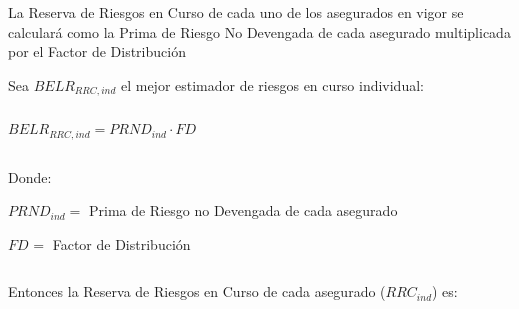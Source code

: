 \documentclass[11pt,twoside,openright,spanish]{report}
\numberwithin{equation}{chapter}
\numberwithin{figure}{chapter}
\numberwithin{table}{chapter}
\begin{document}
	\doublespacing
	
	La Reserva de Riesgos en Curso de cada uno de los asegurados en vigor se calculará como la Prima de Riesgo No Devengada de cada asegurado multiplicada por el Factor de Distribución \begin{comment} y sumando el $BELG_{ADM,ind}$ así como el Margen de Riesgo prorrateado.
	\end{comment}
	\doublespacing
	
	Sea $BELR_{RRC,ind}$ el mejor estimador de riesgos en curso individual:
	
	\doublespacing

$ $

\doublespacing
	
	{\centering	
	\begin{comment}	
		$
		BELR_{RRC,ind}=\begin{cases}
		PRND_{ind}\cdot FD_{}, & \text{$g \neq Salud Dental Individual$}\\
	
		PTND_{ind}\cdot FS_{BEL}^{RRC}, & \text{$g = Salud Dental Individual$}
		\end{cases}
		$
\end{comment}	

	$BELR_{RRC,ind}=PRND_{ind}\cdot FD_{}$	
		\noindent
		
	}
	
	\doublespacing

$ $

\doublespacing
	
	Donde:
	
	\doublespacing
		
	
	$PRND_{ind}=$ Prima de Riesgo no Devengada de cada asegurado
	
	$FD_{}^{}=$ Factor de Distribución
	
		\begin{comment}
	$PTND_{ind}=$ Prima de Tarifa no Devengada de cada asegurado
	

	$FS_{BEL}^{RRC}=$ Factor de Siniestralidad última con información de mercado
	\end{comment}
	
	\doublespacing

$ $

\doublespacing
	
	Entonces la Reserva de Riesgos en Curso de cada asegurado ($RRC_{ind}$) es:
	
	\doublespacing

$ $

\doublespacing
	
\end{document}
